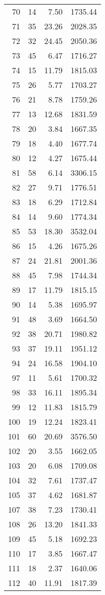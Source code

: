 \begin{appendix}
\begin{longtable}{rrrr}
70 & 14 & 7.50 & 1735.44 \\
71 & 35 & 23.26 & 2028.35 \\
72 & 32 & 24.45 & 2050.36 \\
73 & 45 & 6.47 & 1716.27 \\
74 & 15 & 11.79 & 1815.03 \\
75 & 26 & 5.77 & 1703.27 \\
76 & 21 & 8.78 & 1759.26 \\
77 & 13 & 12.68 & 1831.59 \\
78 & 20 & 3.84 & 1667.35 \\
79 & 18 & 4.40 & 1677.74 \\
80 & 12 & 4.27 & 1675.44 \\
81 & 58 & 6.14 & 3306.15 \\
82 & 27 & 9.71 & 1776.51 \\
83 & 18 & 6.29 & 1712.84 \\
84 & 14 & 9.60 & 1774.34 \\
85 & 53 & 18.30 & 3532.04 \\
86 & 15 & 4.26 & 1675.26 \\
87 & 24 & 21.81 & 2001.36 \\
88 & 45 & 7.98 & 1744.34 \\
89 & 17 & 11.79 & 1815.15 \\
90 & 14 & 5.38 & 1695.97 \\
91 & 48 & 3.69 & 1664.50 \\
92 & 38 & 20.71 & 1980.82 \\
93 & 37 & 19.11 & 1951.12 \\
94 & 24 & 16.58 & 1904.10 \\
97 & 11 & 5.61 & 1700.32 \\
98 & 33 & 16.11 & 1895.34 \\
99 & 12 & 11.83 & 1815.79 \\
100 & 19 & 12.24 & 1823.41 \\
101 & 60 & 20.69 & 3576.50 \\
102 & 20 & 3.55 & 1662.05 \\
103 & 20 & 6.08 & 1709.08 \\
104 & 32 & 7.61 & 1737.47 \\
105 & 37 & 4.62 & 1681.87 \\
107 & 38 & 7.23 & 1730.41 \\
108 & 26 & 13.20 & 1841.33 \\
109 & 45 & 5.18 & 1692.23 \\
110 & 17 & 3.85 & 1667.47 \\
111 & 18 & 2.37 & 1640.06 \\
112 & 40 & 11.91 & 1817.39 \\
\bottomrule
\end{longtable}


\end{appendix}
